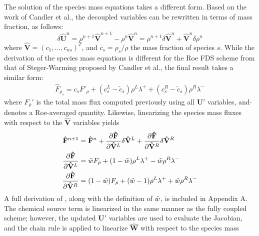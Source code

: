 The solution of the species mass equations takes a different form.  Based on the
work of Candler et al.\cite{candler}, the decoupled variables can be rewritten
in terms of mass fraction, as follows:
\begin{equation}
  \delta \mathbf{\hat{U}}^n =
  \rho^{n+1}\mathbf{\hat{V}}^{n+1}-\rho^n\mathbf{\hat{V}}^n = \rho^{n+1} \delta
  \mathbf{\hat{V}}^n + \mathbf{\hat{V}}^n \delta \rho^n 
\end{equation}
where $\mathbf{\hat{V}}=(c_1,\hdots,c_{ns})^T$, and $c_s=\rho_s/\rho$ the mass
fraction of species $s$.  While the derivation of the species mass equations is
different for the Roe FDS scheme from that of Steger-Warming proposed by Candler
et al.\cite{candler}, the final result takes a similar form: 
\begin{gather}
  \hat{F}_{\rho_s} = c_s F'_\rho+(c_s^L-\tilde{c}_s)\rho^L\lambda^+
  + (c_s^R-\tilde{c}_s)\rho^R\lambda^-
  \label{dc_flux}
\end{gather}
where $F_\rho'$ is the total mass flux computed previously using all
$\mathbf{U}'$ variables, and $\tilde{}$ denotes a Roe-averaged quantity.
Likewise, linearizing the species mass fluxes with respect to the
$\mathbf{\hat{V}}$ variables yields
\begin{align} 
  \mathbf{\hat{F}}^{n+1} &=\mathbf{\hat{F}}^n 
  + \frac{\partial \mathbf{\hat{F}}}{\partial \mathbf{\hat{V}}^L} \delta \mathbf{\hat{V}}^L
  + \frac{\partial \mathbf{\hat{F}}}{\partial \mathbf{\hat{V}}^R} \delta \mathbf{\hat{V}}^R
  \label{flux-dc-taylor} \\
  \frac{\partial \mathbf{\hat{F}}}{\partial \mathbf{\hat{V}}^L} &= 
  \tilde{w} F_\rho+(1-\tilde{w})\rho^L\lambda^+ - \tilde{w} \rho^R\lambda^-
  \label{dfdvl} \\
  \frac{\partial \mathbf{\hat{F}}}{\partial \mathbf{\hat{V}}^R} &= 
  ( 1-\tilde{w} )F_\rho+(\tilde{w} -1)\rho^L\lambda^+ + \tilde{w} \rho^R\lambda^-
  \label{dfdvr}
\end{align}
A full derivation of , along with the
definition of $\tilde{w}$, is included in Appendix A.  The chemical source term is
linearized in the same manner as the fully coupled scheme; however, the updated
$\mathbf{U}'$ variables are used to evaluate the Jacobian, and the chain rule is
applied to linearize $\mathbf{\hat{W}}$ with respect to the species mass
